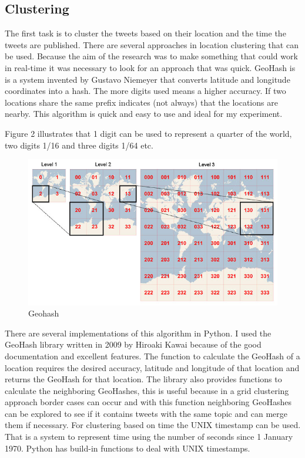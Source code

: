 \documentclass[
10pt, %
a4paper, %
oneside, %
headinclude,footinclude, %
BCOR5mm, %
]{scrartcl}
\begin{document}
\subsection{Clustering}
The first task is to cluster the tweets based on their location and the time the tweets are published. There are several approaches in location clustering that can be used. Because the aim of the research was to make something that could work in real-time it was necessary to look for an approach that was quick. GeoHash is is a system invented by Gustavo Niemeyer that converts latitude and longitude coordinates into a hash. The more digits used means a higher accuracy. If two locations share the same prefix indicates (not always) that the locations are nearby. This algorithm is quick and easy to use and ideal for my experiment.

Figure 2 illustrates that 1 digit can be used to represent a quarter of the world, two digits 1/16 and three digits 1/64 etc. 
\begin{figure}[htbp] %
   \centering
   \includegraphics[width=4.5in]{geohash.jpg} 
   \caption{Geohash}
   \label{fig:geohash}
\end{figure}

There are several implementations of this algorithm in Python. I used the GeoHash library written in 2009 by Hiroaki Kawai because of the good documentation and excellent features. The function to calculate the GeoHash of a location requires the desired accuracy, latitude and longitude of that location and returns the GeoHash for that location. The library also provides functions to calculate the neighboring GeoHashes, this is useful because in a grid clustering approach border cases can occur and with this function neighboring GeoHashes can be explored to see if it contains tweets with the same topic and can merge them if necessary. For clustering based on time the UNIX timestamp can be used. That is a system to represent time using the number of seconds since 1 January 1970. Python has build-in functions to deal with UNIX timestamps.
\end{document}
